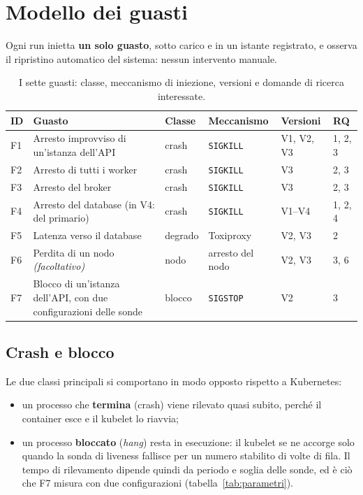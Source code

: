 \chapter{Modello dei guasti}
\label{cap:guasti}

Ogni run inietta \textbf{un solo guasto}, sotto carico e in un istante registrato, e osserva il ripristino automatico del sistema: nessun intervento manuale.

\begin{table}[htbp]
\centering
\caption{I sette guasti: classe, meccanismo di iniezione, versioni e domande di ricerca interessate.}
\label{tab:guasti}
\begin{tabularx}{\linewidth}{@{}lLllll@{}}
\toprule
\textbf{ID} & \textbf{Guasto} & \textbf{Classe} & \textbf{Meccanismo} & \textbf{Versioni} & \textbf{RQ} \\
\midrule
F1 & Arresto improvviso di un'istanza dell'API & crash & \texttt{SIGKILL} & V1, V2, V3 & 1, 2, 3 \\
F2 & Arresto di tutti i worker & crash & \texttt{SIGKILL} & V3 & 2, 3 \\
F3 & Arresto del broker & crash & \texttt{SIGKILL} & V3 & 2, 3 \\
F4 & Arresto del database (in V4: del primario) & crash & \texttt{SIGKILL} & V1--V4 & 1, 2, 4 \\
F5 & Latenza verso il database & degrado & Toxiproxy & V2, V3 & 2 \\
F6 & Perdita di un nodo \textit{(facoltativo)} & nodo & arresto del nodo & V2, V3 & 3, 6 \\
F7 & Blocco di un'istanza dell'API, con due configurazioni delle sonde & blocco & \texttt{SIGSTOP} & V2 & 3 \\
\bottomrule
\end{tabularx}
\end{table}

\section{Crash e blocco}

Le due classi principali si comportano in modo opposto rispetto a Kubernetes:

\begin{itemize}
  \item un processo che \textbf{termina} (crash) viene rilevato quasi subito, perché il container esce e il kubelet lo riavvia;
  \item un processo \textbf{bloccato} (\textit{hang}) resta in esecuzione: il kubelet se ne accorge solo quando la sonda di liveness fallisce per un numero stabilito di volte di fila. Il tempo di rilevamento dipende quindi da periodo e soglia delle sonde, ed è ciò che F7 misura con due configurazioni (tabella~\ref{tab:parametri}).
\end{itemize}

